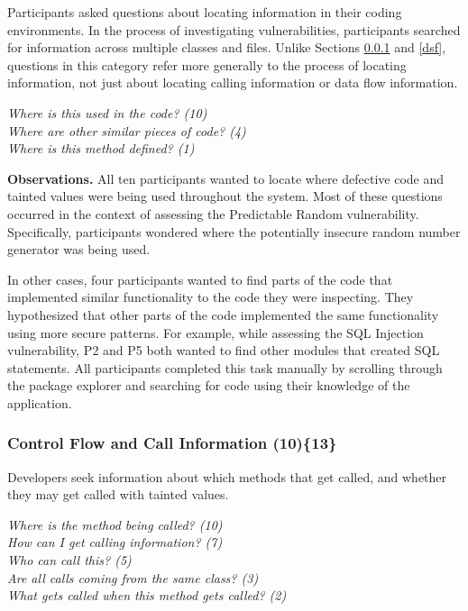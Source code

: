 \documentclass{acm_proc_article-sp}
\begin{document}
Participants asked questions about locating information in their coding environments.
In the process of investigating vulnerabilities, participants searched for information across multiple classes and files.
Unlike Sections \ref{cf} and \ref{dsf}, questions in this category refer more generally to the process of locating information, not just about locating calling information or data flow information.

\noindent\emph{Where is this used in the code? (10)} \\
\emph{Where are other similar pieces of code? (4)} \\
\emph{Where is this method defined? (1)} 



\noindent\textbf{Observations.}
All ten participants wanted to locate where defective code and tainted values were being used throughout the system. 
Most of these questions occurred in the context of assessing the Predictable Random vulnerability.
Specifically, participants wondered where the potentially insecure random number generator was being used.

In other cases, four participants wanted to find parts of the code that implemented similar functionality to the code they were inspecting.
They hypothesized that other parts of the code implemented the same functionality using more secure patterns. 
For example, while assessing the SQL Injection vulnerability, P2 and P5 both wanted to find other modules that created SQL statements.
All participants completed this task manually by scrolling through the package explorer and searching for code using their knowledge of the application.



\subsubsection{\textbf{Control Flow and Call Information (10)\{13\}}}\label{cf}
Developers seek information about which methods that get called, and whether they may get called with tainted values.


\noindent\emph{Where is the method being called? (10)} \\
\emph{How can I get calling information? (7)} \\
\emph{Who can call this? (5)} \\
\emph{Are all calls coming from the same class? (3)} \\
\emph{What gets called when this method gets called? (2)}
\end{document}
